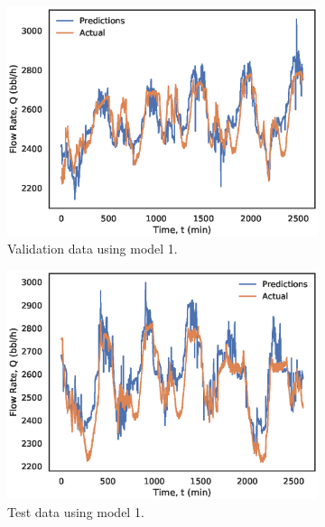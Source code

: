 \begin{figure}[h]
    \centering
     \begin{subfigure}[b]{0.48\textwidth}
         \includegraphics[width=\textwidth]{images/suncor/08cluster1_valid.eps}
         \caption{Validation data using model 1.}
         \label{fig:02cluster1_valid}
     \end{subfigure}
     \begin{subfigure}[b]{0.48\textwidth}
         \includegraphics[width=\textwidth]{images/suncor/08cluster1_test.eps}
         \caption{Test data using model 1.}
         \label{fig:02cluster1_test}
     \end{subfigure}
     \begin{subfigure}[b]{0.48\textwidth}

\end{subfigure}
\end{figure}
